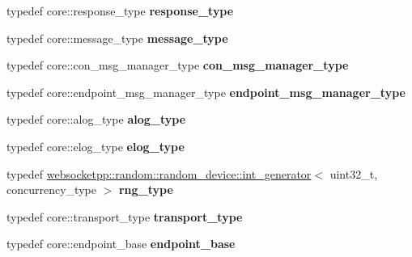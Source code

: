 \begin{DoxyCompactItemize}
\item 
typedef core\+::response\+\_\+type {\bfseries response\+\_\+type}\hypertarget{structstub__config_af5bf09e5641cb374d09ca1cc57a3db68}{}\label{structstub__config_af5bf09e5641cb374d09ca1cc57a3db68}

\item 
typedef core\+::message\+\_\+type {\bfseries message\+\_\+type}\hypertarget{structstub__config_a608dd8f08c2967a1279f862646d5ccfe}{}\label{structstub__config_a608dd8f08c2967a1279f862646d5ccfe}

\item 
typedef core\+::con\+\_\+msg\+\_\+manager\+\_\+type {\bfseries con\+\_\+msg\+\_\+manager\+\_\+type}\hypertarget{structstub__config_ac54fff1ce93b9e96d7c55f7a5f7070b6}{}\label{structstub__config_ac54fff1ce93b9e96d7c55f7a5f7070b6}

\item 
typedef core\+::endpoint\+\_\+msg\+\_\+manager\+\_\+type {\bfseries endpoint\+\_\+msg\+\_\+manager\+\_\+type}\hypertarget{structstub__config_a41f4e1a5902c7a558e4f06b223bff9e3}{}\label{structstub__config_a41f4e1a5902c7a558e4f06b223bff9e3}

\item 
typedef core\+::alog\+\_\+type {\bfseries alog\+\_\+type}\hypertarget{structstub__config_a0d27080bdc8a484a1c742853bcc92673}{}\label{structstub__config_a0d27080bdc8a484a1c742853bcc92673}

\item 
typedef core\+::elog\+\_\+type {\bfseries elog\+\_\+type}\hypertarget{structstub__config_a48001c3d916c6e12404be8ce13e7c06d}{}\label{structstub__config_a48001c3d916c6e12404be8ce13e7c06d}

\item 
typedef \hyperlink{classwebsocketpp_1_1random_1_1random__device_1_1int__generator}{websocketpp\+::random\+::random\+\_\+device\+::int\+\_\+generator}$<$ uint32\+\_\+t, concurrency\+\_\+type $>$ {\bfseries rng\+\_\+type}\hypertarget{structstub__config_a3e04f8ecafbcc47af6949fc7e8cc16d1}{}\label{structstub__config_a3e04f8ecafbcc47af6949fc7e8cc16d1}

\item 
typedef core\+::transport\+\_\+type {\bfseries transport\+\_\+type}\hypertarget{structstub__config_aaada21529a6fe3cb91d8621b4b6f77ff}{}\label{structstub__config_aaada21529a6fe3cb91d8621b4b6f77ff}

\item 
typedef core\+::endpoint\+\_\+base {\bfseries endpoint\+\_\+base}\hypertarget{structstub__config_a9f66dcbba94c7b2d45f366bec76c596f}{}\label{structstub__config_a9f66dcbba94c7b2d45f366bec76c596f}

\end{DoxyCompactItemize}
